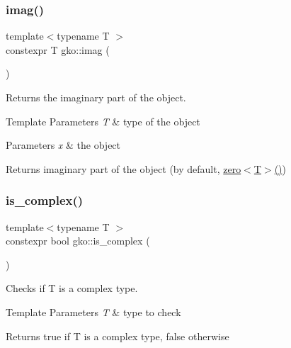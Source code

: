 \subsubsection{\texorpdfstring{imag()}{imag()}}
{\footnotesize\ttfamily template$<$typename T $>$ \\
constexpr T gko\+::imag (\begin{DoxyParamCaption}\item[{const T \&}]{ }\end{DoxyParamCaption})\hspace{0.3cm}{\ttfamily [inline]}}



Returns the imaginary part of the object. 


\begin{DoxyTemplParams}{Template Parameters}
{\em T} & type of the object\\
\hline
\end{DoxyTemplParams}

\begin{DoxyParams}{Parameters}
{\em x} & the object\\
\hline
\end{DoxyParams}
\begin{DoxyReturn}{Returns}
imaginary part of the object (by default, \hyperlink{namespacegko_a70dbe01ff95c7b953d3d737424c6feb5}{zero$<$\+T$>$()}) 
\end{DoxyReturn}
\mbox{\label{namespacegko_a9b3e79911bb6145d7ba865dbe436b915}} 
\subsubsection{\texorpdfstring{is\+\_\+complex()}{is\_complex()}}
{\footnotesize\ttfamily template$<$typename T $>$ \\
constexpr bool gko\+::is\+\_\+complex (\begin{DoxyParamCaption}{ }\end{DoxyParamCaption})\hspace{0.3cm}{\ttfamily [inline]}}



Checks if T is a complex type. 


\begin{DoxyTemplParams}{Template Parameters}
{\em T} & type to check\\
\hline
\end{DoxyTemplParams}
\begin{DoxyReturn}{Returns}
{\ttfamily true} if T is a complex type, {\ttfamily false} otherwise 
\end{DoxyReturn}
\mbox{\label{namespacegko_afb0f20b5d373f9439702e723d48548fa}} 
